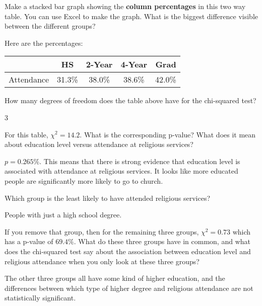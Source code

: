 \documentclass[12pt]{exam}
\begin{document}
\begin{questions}
\item Make a stacked bar graph showing the \textbf{column percentages} in this two way table. You can use Excel to make the graph. What is the biggest difference visible between the different groups?
\begin{solution}
Here are the percentages: 
\begin{center}
\begin{tabular}{l|cccc}
 & HS & 2-Year & 4-Year & Grad \\ \hline
Attendance & 31.3\% & 38.0\% & 38.6\% & 42.0\% \\
\end{tabular}
\end{center}
\end{solution}
\vfill

\item How many degrees of freedom does the table above have for the chi-squared test?
\begin{solution}
3
\end{solution}
\vfill

\item For this table, $\chi^2 = 14.2$. What is the corresponding p-value? What does it mean about education level versus attendance at religious services? 
\begin{solution}
$p= 0.265\%$.  This means that there is strong evidence that education level is associated with attendance at religious services.  It looks like more educated people are significantly more likely to go to church.  
\end{solution}
\vfill

\item Which group is the least likely to have attended religious services?   
\begin{solution}
People with just a high school degree.
\end{solution}
\vfill

\item If you remove that group, then for the remaining three groups, $\chi^2 = 0.73$ which has a p-value of $69.4\%$.  What do these three groups have in common, and what does the chi-squared test say about the association between education level and religious attendance when you only look at these three groups? 
\begin{solution}
The other three groups all have some kind of higher education, and the differences between which type of higher degree and religious attendance are not statistically significant. 
\end{solution}
\vfill

\end{questions}
\end{document}
